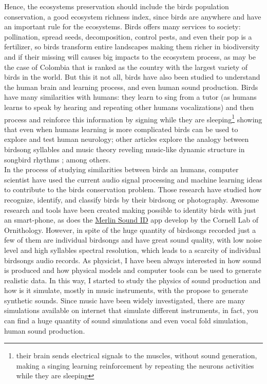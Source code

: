 Hence, the ecosystems preservation should include the birds population conservation, a good ecosystem richness index, since birds are anywhere and have an important rule for the ecosystems. Birds offers many services to society: pollination, spread seeds, decomposition, control pests, and even their pop is a fertilizer, so birds transform entire landscapes making them richer in biodiversity and if their missing will causes big impacts to the ecosystem process, as may be the case of Colombia that is ranked as the country with the largest variety of birds in the world. But this it not all, birds have also been studied to understand the human brain and learning process, and even human sound production. Birds have many similarities with humans: they learn to sing from a tutor \cite{tutor} (as humans learns to speak by hearing and repeating other humans vocalizations) and then process and reinforce this information by signing while they are sleeping\footnote{their brain sends electrical signals to the muscles, without sound generation, making a singing learning reinforcement by repeating the neurons activities while they are sleeping} \cite{brain_to_syllables, sleep} showing that even when humans learning is more complicated birds can be used to explore and test human neurology; other articles explore the analogy between birdsong syllables and music theory reveling music-like dynamic structure in songbird rhythms \cite{music_birdsongs}; among others. \\

In the process of studying similarities between birds an humans, computer scientist have used the current audio signal processing and machine learning ideas to contribute to the birds conservation problem. Those research have studied how recognize, identify, and classify birds by their birdsong or photography. Awesome research and tools have been created making possible to identity birds with just an smart-phone, as does the \href{https://merlin.allaboutbirds.org/sound-id/}{Merlin Sound ID} app develop by the Cornell Lab of Ornithology. However, in spite of the huge quantity of birdsongs recorded just a few of them are individual birdsongs and have great sound quality, with low noise level and high syllables spectral resolution, which leads to a scarcity of individual birdsongs audio records. As physicist, I have been always interested in how sound is produced and how physical models and computer tools can be used to generate realistic data. In  this way, I started to study the physics of sound production and how is it simulate, mostly in music instruments, with the propose to generate synthetic sounds. Since music have been widely investigated, there are many simulations available on internet that simulate different instruments, in fact, you can find a huge quantity of sound simulations and even vocal fold simulation, human sound production.\\

